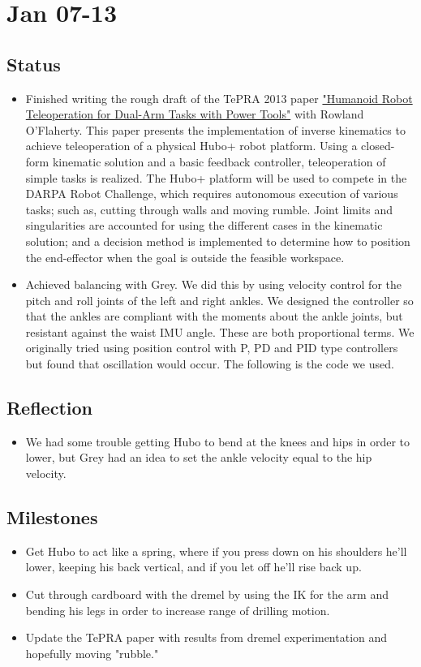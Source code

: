 \documentclass[letterpaper, 10 pt]{report}
\begin{document}
\section*{Jan 07-13}
\subsection*{Status}
\begin{itemize}
\item Finished writing the rough draft of the TePRA 2013 paper \href{https://thebrain.golems.org/svn/papers/2013/TePRA-13-hubo\_teleopTasks/}
{"Humanoid Robot Teleoperation for Dual-Arm Tasks with Power Tools"} with Rowland
O'Flaherty. This paper presents the implementation of inverse kinematics to
achieve teleoperation of a physical Hubo+ robot platform. Using a closed-form
kinematic solution and a basic feedback controller, teleoperation of simple
tasks is realized. The Hubo+ platform will be used to compete in the DARPA Robot
Challenge, which requires autonomous execution of various tasks; such as,
cutting through walls and moving rumble. Joint limits and singularities are
accounted for using the different cases in the kinematic solution; and a
decision method is implemented to determine how to position the end-effector
when the goal is outside the feasible workspace.
\item Achieved balancing with Grey. We did this by using velocity control
for the pitch and roll joints of the left and right ankles. We designed the
controller so that the ankles are compliant with the moments about the ankle
joints, but resistant against the waist IMU angle. These are both proportional
terms. We originally tried using position control with P, PD and PID type
controllers but found that oscillation would occur. The following is the code we
used.
\end{itemize}

\subsection*{Reflection}
\begin{itemize}
\item We had some trouble getting Hubo to bend at the knees and hips in
order to lower, but Grey had an idea to set the ankle velocity equal to the hip
velocity.
\end{itemize}

\subsection*{Milestones}
\begin{itemize}
\item Get Hubo to act like a spring, where if you press down on his
shoulders he'll lower, keeping his back vertical, and if you let off he'll rise
back up.
\item Cut through cardboard with the dremel by using the IK for the arm and
bending his legs in order to increase range of drilling motion.
\item Update the TePRA paper with results from dremel experimentation and
hopefully moving "rubble."
\end{itemize}
\end{document}
